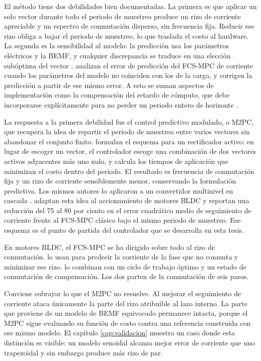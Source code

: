 \documentclass[../../../Tesis_JALS_Maestria.tex]{subfiles}
\begin{document}
El método tiene dos debilidades bien documentadas. La primera es que aplicar un solo vector durante todo el periodo de muestreo produce un rizo de corriente apreciable y un espectro de conmutación disperso, sin frecuencia fija. Reducir ese rizo obliga a bajar el periodo de muestreo, lo que traslada el costo al hardware. La segunda es la sensibilidad al modelo: la predicción usa los parámetros eléctricos y la BEMF, y cualquier discrepancia se traduce en una elección subóptima del vector \citep{rodriguez2013stateofart}. \citet{young2016mismatch} analizan el error de predicción del FCS-MPC de corriente cuando los parámetros del modelo no coinciden con los de la carga, y \citet{siami2016robustness} corrigen la predicción a partir de ese mismo error. A esto se suman aspectos de implementación como la compensación del retardo de cómputo, que debe incorporarse explícitamente para no perder un periodo entero de horizonte \citep{cortes2012delay}.

La respuesta a la primera debilidad fue el control predictivo modulado, o M2PC, que recupera la idea de repartir el periodo de muestreo entre varios vectores sin abandonar el conjunto finito. \citet{tarisciotti2015m2pc} formulan el esquema para un rectificador activo: en lugar de escoger un vector, el controlador escoge una combinación de dos vectores activos adyacentes más uno nulo, y calcula los tiempos de aplicación que minimizan el costo dentro del periodo. El resultado es frecuencia de conmutación fija y un rizo de corriente sensiblemente menor, conservando la formulación predictiva. Los mismos autores lo aplicaron a un convertidor multinivel en cascada \citep{tarisciotti2014m2pc}. \citet{coronado2025} adaptan esta idea al accionamiento de motores BLDC y reportan una reducción del 75 al 80 por ciento en el error cuadrático medio de seguimiento de corriente frente al FCS-MPC clásico bajo el mismo periodo de muestreo. Ese esquema es el punto de partida del controlador que se desarrolla en esta tesis.

En motores BLDC, el FCS-MPC se ha dirigido sobre todo al rizo de conmutación. \citet{xia2013fsmpc} lo usan para predecir la corriente de la fase que no conmuta y minimizar ese rizo. \citet{li2024dutycycle} lo combinan con un ciclo de trabajo óptimo y un estado de conmutación de compensación. Los dos parten de la conmutación de seis pasos.

Conviene subrayar lo que el M2PC no resuelve. Al mejorar el seguimiento de corriente ataca únicamente la parte del rizo atribuible al lazo interno. La parte que proviene de un modelo de BEMF equivocado permanece intacta, porque el M2PC sigue evaluando su función de costo contra una referencia construida con ese mismo modelo. El capítulo \ref{cap:validacion} muestra un caso donde esta distinción es visible: un modelo senoidal alcanza mejor error de corriente que uno trapezoidal y sin embargo produce más rizo de par.
\end{document}
